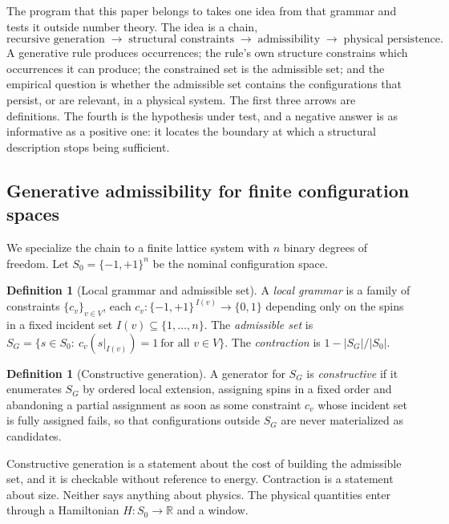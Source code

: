 \documentclass[11pt,a4paper]{article}
\theoremstyle{plain}
\theoremstyle{definition}
\newtheorem{definition}[theorem]{Definition}
\theoremstyle{remark}
\newcommand{\SG}{S_{G}}
\newcommand{\Sz}{S_{0}}
\begin{document}
The program that this paper belongs to takes one idea from that grammar and tests it outside number theory. The idea is a chain,
\[
\text{recursive generation}\;\longrightarrow\;\text{structural constraints}\;\longrightarrow\;\text{admissibility}\;\longrightarrow\;\text{physical persistence}.
\]
A generative rule produces occurrences; the rule's own structure constrains which occurrences it can produce; the constrained set is the admissible set; and the empirical question is whether the admissible set contains the configurations that persist, or are relevant, in a physical system. The first three arrows are definitions. The fourth is the hypothesis under test, and a negative answer is as informative as a positive one: it locates the boundary at which a structural description stops being sufficient.

\subsection{Generative admissibility for finite configuration spaces}
We specialize the chain to a finite lattice system with $n$ binary degrees of freedom. Let $\Sz=\{-1,+1\}^{n}$ be the nominal configuration space.

\begin{definition}[Local grammar and admissible set]\label{def:grammar}
A \emph{local grammar} is a family of constraints $\{c_v\}_{v\in V}$, each $c_v:\{-1,+1\}^{\,I(v)}\to\{0,1\}$ depending only on the spins in a fixed incident set $I(v)\subseteq\{1,\dots,n\}$. The \emph{admissible set} is $\SG=\{s\in\Sz:\ c_v(s|_{I(v)})=1\ \text{for all }v\in V\}$. The \emph{contraction} is $1-|\SG|/|\Sz|$.
\end{definition}

\begin{definition}[Constructive generation]\label{def:constructive}
A generator for $\SG$ is \emph{constructive} if it enumerates $\SG$ by ordered local extension, assigning spins in a fixed order and abandoning a partial assignment as soon as some constraint $c_v$ whose incident set is fully assigned fails, so that configurations outside $\SG$ are never materialized as candidates.
\end{definition}

Constructive generation is a statement about the cost of building the admissible set, and it is checkable without reference to energy. Contraction is a statement about size. Neither says anything about physics. The physical quantities enter through a Hamiltonian $H:\Sz\to\mathbb{R}$ and a window.
\end{document}
